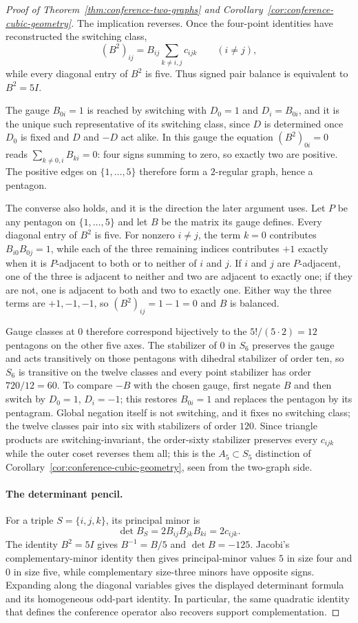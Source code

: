 \documentclass[11pt]{article}
\theoremstyle{definition}
\theoremstyle{remark}
\newcommand{\A}{A_5}
\begin{document}
\begin{proof}[Proof of Theorem~\ref{thm:conference-two-graphs} and
Corollary~\ref{cor:conference-cubic-geometry}]
The implication reverses.  Once the four-point identities have
reconstructed the switching class,
\[
 (B^2)_{ij}=B_{ij}\sum_{k\ne i,j}c_{ijk}
 \qquad(i\ne j),
\]
while every diagonal entry of $B^2$ is five.  Thus signed pair balance is
equivalent to $B^2=5I$.

The gauge $B_{0i}=1$ is reached by switching with $D_0=1$ and $D_i=B_{0i}$,
and it is the unique such representative of its switching class, since $D$
is determined once $D_0$ is fixed and $D$ and $-D$ act alike.  In this
gauge the equation $(B^2)_{0i}=0$ reads $\sum_{k\ne0,i}B_{ki}=0$: four
signs summing to zero, so exactly two are positive.  The positive edges on
$\{1,\ldots,5\}$ therefore form a $2$-regular graph, hence a pentagon.

The converse also holds, and it is the direction the later argument uses.
Let $P$ be any pentagon on $\{1,\ldots,5\}$ and let $B$ be the matrix its
gauge defines.  Every diagonal entry of $B^2$ is five.  For nonzero
$i\ne j$, the term $k=0$ contributes $B_{i0}B_{0j}=1$, while each of the
three remaining indices contributes $+1$ exactly when it is $P$-adjacent to
both or to neither of $i$ and $j$.  If $i$ and $j$ are $P$-adjacent, one of
the three is adjacent to neither and two are adjacent to exactly one; if
they are not, one is adjacent to both and two to exactly one.  Either way
the three terms are $+1,-1,-1$, so $(B^2)_{ij}=1-1=0$ and $B$ is balanced.

Gauge classes at $0$ therefore correspond bijectively to the
$5!/(5\cdot2)=12$ pentagons on the other five axes.  The stabilizer of $0$
in $S_6$ preserves the gauge and acts transitively on those pentagons with
dihedral stabilizer of order ten, so $S_6$ is transitive on the twelve
classes and every point stabilizer has order $720/12=60$. To compare $-B$
with the chosen gauge, first negate $B$ and then switch by $D_0=1$,
$D_i=-1$; this restores $B_{0i}=1$ and replaces the pentagon by its
pentagram. Global negation itself is not switching, and it fixes no
switching class; the twelve classes pair into six with stabilizers of
order $120$.  Since triangle products are switching-invariant, the
order-sixty stabilizer preserves every $c_{ijk}$ while the outer coset
reverses them all; this is the $\A\subset S_5$ distinction of
Corollary~\ref{cor:conference-cubic-geometry}, seen from the two-graph
side.

\paragraph{The determinant pencil.}
For a triple $S=\{i,j,k\}$, its principal minor is
\[
 \det B_S=2B_{ij}B_{jk}B_{ki}=2c_{ijk}.
\]
The identity $B^2=5I$ gives $B^{-1}=B/5$ and $\det B=-125$.
Jacobi's complementary-minor identity then gives principal-minor values
$5$ in size four and $0$ in size five, while complementary size-three
minors have opposite signs. Expanding along the diagonal variables gives
the displayed determinant formula and its homogeneous odd-part identity.
In particular, the same quadratic identity that defines the conference
operator also recovers support complementation.


\end{proof}
\end{document}
